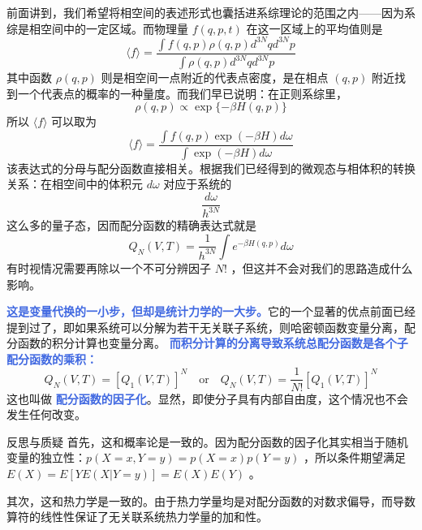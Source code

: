 \documentclass[hyperref,UTF-8]{ctexart}
\newcommand{\0}{\boldsymbol{0}}
\begin{document}
前面讲到，我们希望将相空间的表述形式也囊括进系综理论的范围之内——因为系综是相空间中的一定区域。而物理量 $f(q,p,t)$ 在这一区域上的平均值则是
\begin{equation}
    \langle f\rangle=\frac{\int f(q, p) \rho(q, p) d^{3 N} q d^{3 N} p}{\int \rho(q, p) d^{3 N} q d^{3 N} p}
\end{equation}
其中函数 $\rho(q,p)$ 则是相空间一点附近的代表点密度，是在相点 $(q,p)$ 附近找到一个代表点的概率的一种量度。而我们早已说明：在正则系综里，
\begin{equation}
    \rho(q, p) \propto \exp \{-\beta H(q, p)\}
\end{equation}
所以 $\langle f \rangle$ 可以取为
\begin{equation}
    \langle f\rangle=\frac{\int f(q, p) \exp (-\beta H) d \omega}{\int \exp (-\beta H) d \omega}
\end{equation}
该表达式的分母与配分函数直接相关。根据我们已经得到的微观态与相体积的转换关系：在相空间中的体积元 $d\omega$ 对应于系统的
\[
    \frac{d\omega}{h^{3N}} 
\]
这么多的量子态，因而配分函数的精确表达式就是
\begin{equation}
    Q_N(V, T)=\frac{1}{ h^{3 N}} \int e^{-\beta H(q, p)} d \omega
\end{equation}
有时视情况需要再除以一个不可分辨因子 $N!$ ，但这并不会对我们的思路造成什么影响。

\textcolor{RoyalBlue}{\textbf{\kaishu 这是变量代换的一小步，但却是统计力学的一大步。}}它的一个显著的优点前面已经提到过了，即如果系统可以分解为若干无关联子系统，则哈密顿函数变量分离，配分函数的积分计算也变量分离。 \textcolor{RoyalBlue}{\textbf{\kaishu  而积分计算的分离导致系统总配分函数是各个子配分函数的乘积：}}
\begin{equation}
    Q_N(V, T)=\left[Q_1(V, T)\right]^N \quad\text{or}\quad Q_N(V, T)=\frac{1}{N !}\left[Q_1(V, T)\right]^N
\end{equation}
这也叫做 \textcolor{RoyalBlue}{\textbf{\kaishu 配分函数的因子化}}。显然，即使分子具有内部自由度，这个情况也不会发生任何改变。

\begin{justification}{\kaishu 反思与质疑}
\kaishu \fontsize{11pt}{16pt}
    \quad\quad 首先，这和概率论是一致的。因为配分函数的因子化其实相当于随机变量的独立性：$p(X = x, Y = y) = p(X = x)p(Y = y)$ ，所以条件期望满足 $E(X) = E[YE(X|Y = y)] = E(X)E(Y)$ 。

    \quad\quad 其次，这和热力学是一致的。由于热力学量均是对配分函数的对数求偏导，而导数算符的线性性保证了无关联系统热力学量的加和性。
\end{justification}
\end{document}
